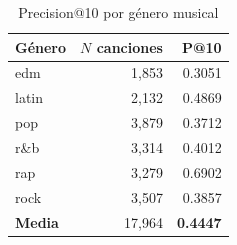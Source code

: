 \begin{table}[htbp]
  \centering
  \caption{Precision@10 por género musical}
  \label{tab:recommendation_precision_per_genre}
  \begin{tabular}{lrr}
    \toprule
    Género & $N$ canciones & P@10 \\
    \midrule
    edm & 1,853 & 0.3051 \\
    latin & 2,132 & 0.4869 \\
    pop & 3,879 & 0.3712 \\
    r\&b & 3,314 & 0.4012 \\
    rap & 3,279 & 0.6902 \\
    rock & 3,507 & 0.3857 \\
    \midrule
    \textbf{Media} & 17,964 & \textbf{0.4447} \\
    \bottomrule
  \end{tabular}
\end{table}